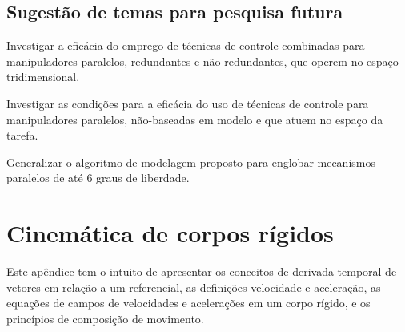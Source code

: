 \documentclass[]{politex}
\begin{document}
\section{Sugestão de temas para pesquisa futura}

Investigar a eficácia do emprego de técnicas de controle combinadas para manipuladores paralelos, redundantes e não-redundantes, que operem no espaço tridimensional.

\vspace{0.3cm}

Investigar as condições para a eficácia do uso de técnicas de controle para manipuladores paralelos, não-baseadas em modelo e que atuem no espaço da tarefa.

\vspace{0.3cm}

Generalizar o algoritmo de modelagem proposto para englobar mecanismos paralelos de até 6 graus de liberdade.




%






\apendice

\chapter{Cinemática de corpos rígidos} \label{ap:CinCorposRig}

Este apêndice tem o intuito de apresentar os conceitos de derivada temporal de vetores em relação a um referencial, as definições velocidade e aceleração, as equações de campos de velocidades e acelerações em um corpo rígido, e os princípios de composição de movimento.
\end{document}
